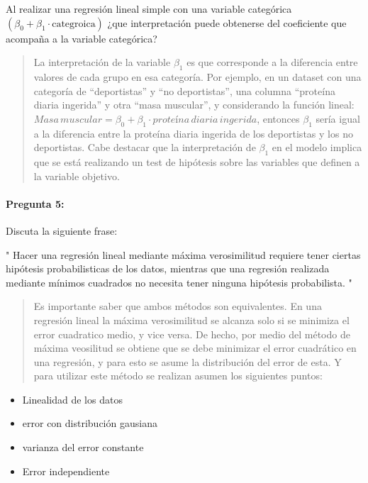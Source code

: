 \documentclass[]{article}
\providecommand{\tightlist}{%
  \setlength{\itemsep}{0pt}\setlength{\parskip}{0pt}}
\let\oldparagraph\paragraph
\renewcommand{\paragraph}[1]{\oldparagraph{#1}\mbox{}}
\begin{document}
Al realizar una regresión lineal simple con una variable categórica
\((\beta_{0} + \beta_{1} \cdot \text{categroica})\) ¿que interpretación
puede obtenerse del coeficiente que acompaña a la variable categórica?

\begin{quote}
La interpretación de la variable \(\beta_{1}\) es que corresponde a la
diferencia entre valores de cada grupo en esa categoría. Por ejemplo, en
un dataset con una categoría de ``deportistas'' y ``no deportistas'',
una columna ``proteína diaria ingerida'' y otra ``masa muscular'', y
considerando la función lineal:
\(Masa \, muscular = \beta_{0} + \beta_{1} \cdot proteína \, diaria \, ingerida\),
entonces \(\beta_{1}\) sería igual a la diferencia entre la proteína
diaria ingerida de los deportistas y los no deportistas. Cabe destacar
que la interpretación de \(\beta_{1}\) en el modelo implica que se está
realizando un test de hipótesis sobre las variables que definen a la
variable objetivo.
\end{quote}

\hypertarget{pregunta-5}{%
\paragraph{\texorpdfstring{\textbf{Pregunta
5:}}{Pregunta 5:}}\label{pregunta-5}}

Discuta la siguiente frase:

" Hacer una regresión lineal mediante máxima verosimilitud requiere
tener ciertas hipótesis probabilisticas de los datos, mientras que una
regresión realizada mediante mínimos cuadrados no necesita tener ninguna
hipótesis probabilista. "

\begin{quote}
Es importante saber que ambos métodos son equivalentes. En una regresión
lineal la máxima verosimilitud se alcanza solo si se minimiza el error
cuadratico medio, y vice versa. De hecho, por medio del método de máxima
veosilitud se obtiene que se debe minimizar el error cuadrático en una
regresión, y para esto se asume la distribución del error de esta. Y
para utilizar este método se realizan asumen los siguientes puntos:
\end{quote}

\begin{itemize}
\tightlist
\item
  Linealidad de los datos
\item
  error con distribución gausiana
\item
  varianza del error constante
\item
  Error independiente
\end{itemize}
\end{document}
